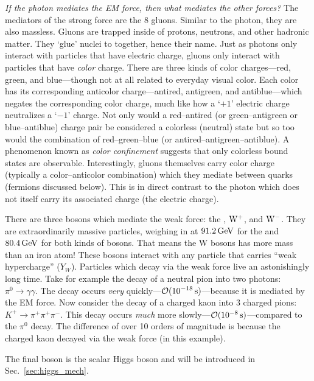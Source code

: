 \emph{If the photon mediates the EM force, then what mediates the other forces?}
The mediators of the strong force are the 8 gluons. 
Similar to the photon, they are also massless.
Gluons are trapped inside of protons, neutrons, and other hadronic matter. 
They `glue' nuclei to together, hence their name.
Just as photons only interact with particles that have electric charge, gluons only interact with particles that have \emph{color} charge.
There are three kinds of color charges---red, green, and blue---though not at all related to everyday visual color.
Each color has its corresponding anticolor charge---antired, antigreen, and antiblue---which negates the corresponding color charge, much like how a `$+1$' electric charge neutralizes a `$-1$' charge.
Not only would a red--antired (or green--antigreen or blue--antiblue) charge pair be considered a colorless (neutral) state but so too would the combination of red--green--blue (or antired--antigreen--antiblue).
A phenomenon known as \emph{color confinement} suggests that only colorless bound states are observable.
Interestingly, gluons themselves carry color charge (typically a color--anticolor combination) which they mediate between quarks (fermions discussed below).
This is in direct contrast to the photon which does not itself carry its associated charge (the electric charge).

There are three bosons which mediate the weak force: the \PZ, $\mathrm{W}^+$, and $\mathrm{W}^-$.
They are extraordinarily massive particles, weighing in at $91.2\,\text{Ge\hspace{-.08em}V}$ for the \PZ and $80.4\,\text{Ge\hspace{-.08em}V}$ for both kinds of \PW bosons. 
That means the W bosons has more mass than an iron atom!
These bosons interact with any particle that carries ``weak hypercharge'' ($Y_W$).
Particles which decay via the weak force live an astonishingly long time. 
Take for example the decay of a neutral pion into two photons:
$\pi^0 \to \gamma \gamma$. 
The decay occurs \emph{very} quickly---$\mathcal{O}(\text{10}^\text{$-$18}\,\text{s})$---because it is mediated by the EM force.
Now consider the decay of a charged kaon into 3 charged pions:
$K^+ \to \pi^+ \pi^+ \pi^-$.
This decay occurs \emph{much} more slowly---$\mathcal{O}(\text{10}^\text{$-$8}\,\text{s})$---compared to the $\pi^0$ decay.
The difference of over 10 orders of magnitude is because the charged kaon decayed via the weak force (in this example).

The final boson is the scalar Higgs boson and will be introduced in Sec.~\ref{sec:higgs_mech}.


